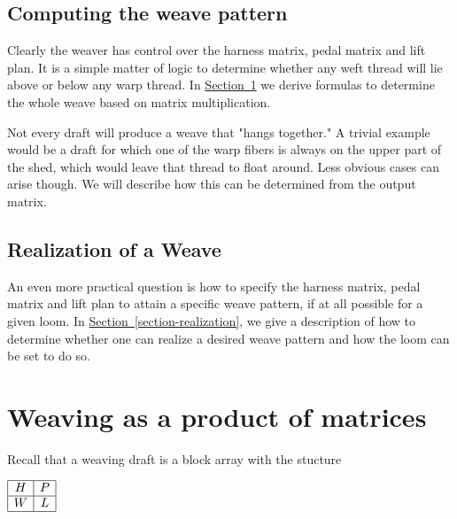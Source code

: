 \documentclass[10pt,]{article}
\theoremstyle{plain}
\begin{document}
\subsection[Computing the weave pattern]{Computing the weave pattern}\label{subsection-3}
Clearly the weaver has control over the harness matrix, pedal matrix and lift plan.   It is a simple matter of logic to determine whether any weft thread will lie above or below any warp thread.  In \hyperref[section-products]{Section~\ref{section-products}} we derive formulas to determine the whole weave based on matrix multiplication.%
\par
Not every draft will produce a weave that "hangs together."  A trivial example would be a draft for which one of the warp fibers is always on the upper part of the shed, which would leave that thread to float around.  Less obvious cases can arise though.  We will describe how this can be determined from the output matrix.%
\typeout{************************************************}
\typeout{************************************************}
\subsection[Realization of a Weave]{Realization of a Weave}\label{subsection-4}
An even more practical question is how to specify the harness matrix, pedal matrix and lift plan to attain a specific weave pattern, if at all possible for a given loom.  In \hyperref[section-realization]{Section~\ref{section-realization}}, we give a description of how to determine whether one can  realize a desired weave pattern and how the loom can be set to do so.%
\typeout{************************************************}
\typeout{************************************************}
\section[Weaving as a product of matrices]{Weaving as a product of matrices}\label{section-products}
Recall that a weaving draft is a block array with the stucture


\(\begin{array}{|c|c|}
\hline
 H &P \\
\hline
 W &L \\
\hline
\end{array}\)
\end{document}
